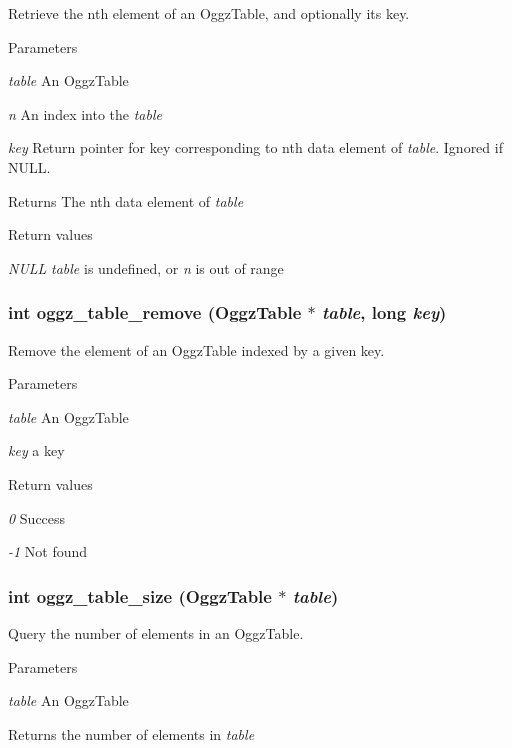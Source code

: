 Retrieve the nth element of an OggzTable, and optionally its key. 


\begin{DoxyParams}{Parameters}
\item[{\em table}]An OggzTable \item[{\em n}]An index into the {\itshape table\/} \item[{\em key}]Return pointer for key corresponding to nth data element of {\itshape table\/}. Ignored if NULL. \end{DoxyParams}
\begin{DoxyReturn}{Returns}
The nth data element of {\itshape table\/} 
\end{DoxyReturn}

\begin{DoxyRetVals}{Return values}
\item[{\em NULL}]{\itshape table\/} is undefined, or {\itshape n\/} is out of range \end{DoxyRetVals}
\subsubsection[{oggz\_\-table\_\-remove}]{\setlength{\rightskip}{0pt plus 5cm}int oggz\_\-table\_\-remove ({\bf OggzTable} $\ast$ {\em table}, \/  long {\em key})}\label{oggz__table_8h_ac137e535f1da63ee52266b47f114020f}


Remove the element of an OggzTable indexed by a given key. 


\begin{DoxyParams}{Parameters}
\item[{\em table}]An OggzTable \item[{\em key}]a key \end{DoxyParams}

\begin{DoxyRetVals}{Return values}
\item[{\em 0}]Success \item[{\em -\/1}]Not found \end{DoxyRetVals}
\subsubsection[{oggz\_\-table\_\-size}]{\setlength{\rightskip}{0pt plus 5cm}int oggz\_\-table\_\-size ({\bf OggzTable} $\ast$ {\em table})}\label{oggz__table_8h_a62db2037df45db88a75b89b8a8ac7766}


Query the number of elements in an OggzTable. 


\begin{DoxyParams}{Parameters}
\item[{\em table}]An OggzTable \end{DoxyParams}
\begin{DoxyReturn}{Returns}
the number of elements in {\itshape table\/} 
\end{DoxyReturn}
